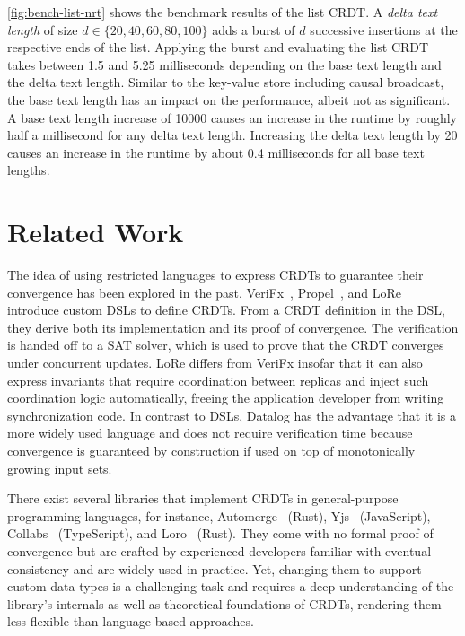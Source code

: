 

\ref{fig:bench-list-nrt} shows the benchmark results of the list \ac{CRDT}.
A \emph{delta text length} of size \(d \in \{20, 40, 60, 80, 100\}\) adds
a burst of \(d\) successive insertions at the respective ends of the list.
Applying the burst and evaluating the list \ac{CRDT} takes between 1.5 and
5.25 milliseconds depending on the base text length and the delta text length.
Similar to the key-value store including causal broadcast,
the base text length has an impact on the performance, albeit not as significant.
A base text length increase of 10000 causes an increase in the runtime by roughly
half a millisecond for any delta text length.
Increasing the delta text length by 20 causes an increase in the runtime
by about 0.4 milliseconds for all base text lengths.

\section{Related Work}\label{sec:related-work}

The idea of using restricted languages to express \acp{CRDT} to guarantee
their convergence has been explored in the past.
VeriFx~\cite{verifx}, Propel~\cite{propel}, and LoRe~\cite{lore} introduce
custom \acp{DSL} to define \acp{CRDT}.
From a \ac{CRDT} definition in the \ac{DSL},
they derive both its implementation and its proof of convergence.
The verification is handed off to a \acs{SAT} solver, which is used to
prove that the \ac{CRDT} converges under concurrent updates.
LoRe differs from VeriFx insofar that it can also express invariants that
require coordination between replicas and inject such coordination logic
automatically, freeing the application developer from writing synchronization
code.
In contrast to \acp{DSL}, Datalog has the advantage that it is a more widely used
language and does not require verification time because convergence is
guaranteed by construction if used on top of monotonically growing input sets.

There exist several libraries that implement \acp{CRDT} in general-purpose
programming languages, for instance, Automerge~\cite{automerge} (Rust),
Yjs~\cite{yjs} (JavaScript), Collabs~\cite{collabs} (TypeScript),
and Loro~\cite{loro} (Rust).
They come with no formal proof of convergence but are crafted by experienced
developers familiar with eventual consistency and are widely used in practice.
Yet, changing them to support custom data types is a challenging task and
requires a deep understanding of the library's internals as well as theoretical
foundations of \acp{CRDT}, rendering them less flexible than language based
approaches.

